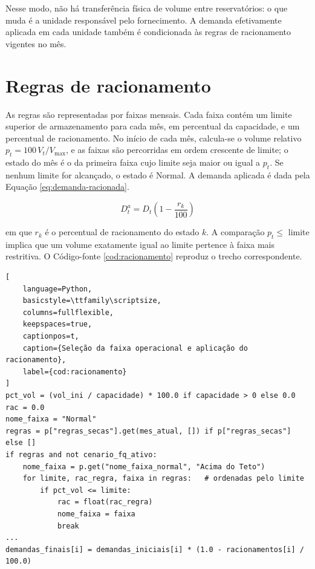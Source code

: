 Nesse modo, não há transferência física de volume entre reservatórios: o que muda é a unidade responsável pelo fornecimento. A demanda efetivamente aplicada em cada unidade também é condicionada às regras de racionamento vigentes no mês.

\section{Regras de racionamento}
\label{sec:regras-racionamento}

As regras são representadas por faixas mensais. Cada faixa contém um limite superior de armazenamento para cada mês, em percentual da capacidade, e um percentual de racionamento. No início de cada mês, calcula-se o volume relativo $p_t = 100\,V_t/V_{\max}$, e as faixas são percorridas em ordem crescente de limite; o estado do mês é o da primeira faixa cujo limite seja maior ou igual a $p_t$. Se nenhum limite for alcançado, o estado é Normal. A demanda aplicada é dada pela Equação \ref{eq:demanda-racionada}.

\begin{equation}
    D^{a}_t = D_t \left(1-\frac{r_k}{100}\right)
    \label{eq:demanda-racionada}
\end{equation}

em que $r_k$ é o percentual de racionamento do estado $k$. A comparação $p_t \leq$ limite implica que um volume exatamente igual ao limite pertence à faixa mais restritiva. O Código-fonte \ref{cod:racionamento} reproduz o trecho correspondente.

\noindent\begin{minipage}{\linewidth}
\begin{lstlisting}[
    language=Python,
    basicstyle=\ttfamily\scriptsize,
    columns=fullflexible,
    keepspaces=true,
    captionpos=t,
    caption={Seleção da faixa operacional e aplicação do racionamento},
    label={cod:racionamento}
]
pct_vol = (vol_ini / capacidade) * 100.0 if capacidade > 0 else 0.0
rac = 0.0
nome_faixa = "Normal"
regras = p["regras_secas"].get(mes_atual, []) if p["regras_secas"] else []
if regras and not cenario_fq_ativo:
    nome_faixa = p.get("nome_faixa_normal", "Acima do Teto")
    for limite, rac_regra, faixa in regras:   # ordenadas pelo limite
        if pct_vol <= limite:
            rac = float(rac_regra)
            nome_faixa = faixa
            break
...
demandas_finais[i] = demandas_iniciais[i] * (1.0 - racionamentos[i] / 100.0)
\end{lstlisting}
\end{minipage}
\par\medskip

